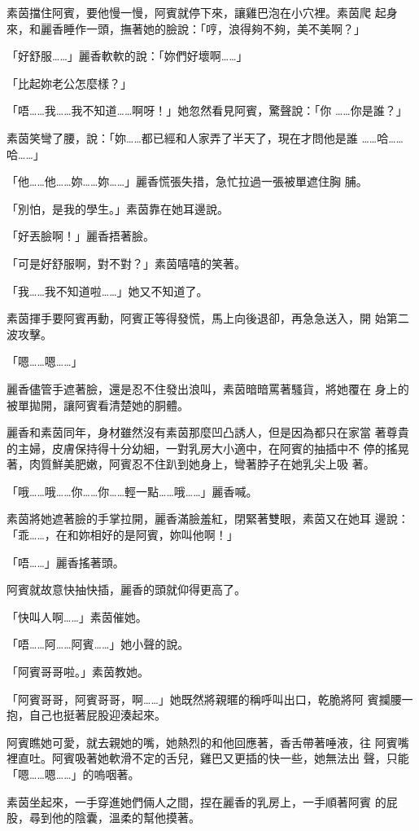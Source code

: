 素茵擋住阿賓，要他慢一慢，阿賓就停下來，讓雞巴泡在小穴裡。素茵爬
起身來，和麗香睡作一頭，撫著她的臉說：「哼，浪得夠不夠，美不美啊？」

「好舒服……」麗香軟軟的說：「妳們好壞啊……」

「比起妳老公怎麼樣？」

「唔……我……我不知道……啊呀！」她忽然看見阿賓，驚聲說：「你
……你是誰？」

素茵笑彎了腰，說：「妳……都已經和人家弄了半天了，現在才問他是誰
……哈……哈……」

「他……他……妳……妳……」麗香慌張失措，急忙拉過一張被單遮住胸
脯。

「別怕，是我的學生。」素茵靠在她耳邊說。

「好丟臉啊！」麗香捂著臉。

「可是好舒服啊，對不對？」素茵嘻嘻的笑著。

「我……我不知道啦……」她又不知道了。

素茵揮手要阿賓再動，阿賓正等得發慌，馬上向後退卻，再急急送入，開
始第二波攻擊。

「嗯……嗯……」

麗香儘管手遮著臉，還是忍不住發出浪叫，素茵暗暗罵著騷貨，將她覆在
身上的被單拋開，讓阿賓看清楚她的胴體。

麗香和素茵同年，身材雖然沒有素茵那麼凹凸誘人，但是因為都只在家當
著尊貴的主婦，皮膚保持得十分幼細，一對乳房大小適中，在阿賓的抽插中不
停的搖晃著，肉質鮮美肥嫩，阿賓忍不住趴到她身上，彎著脖子在她乳尖上吸
著。

「哦……哦……你……你……輕一點……哦……」麗香喊。

素茵將她遮著臉的手掌拉開，麗香滿臉羞紅，閉緊著雙眼，素茵又在她耳
邊說：「乖……，在和妳相好的是阿賓，妳叫他啊！」

「唔……」麗香搖著頭。

阿賓就故意快抽快插，麗香的頭就仰得更高了。

「快叫人啊……」素茵催她。

「唔……阿……阿賓……」她小聲的說。

「阿賓哥哥啦。」素茵教她。

「阿賓哥哥，阿賓哥哥，啊……」她既然將親暱的稱呼叫出口，乾脆將阿
賓攔腰一抱，自己也挺著屁股迎湊起來。

阿賓瞧她可愛，就去親她的嘴，她熱烈的和他回應著，香舌帶著唾液，往
阿賓嘴裡直吐。阿賓吸著她軟滑不定的舌兒，雞巴又更插的快一些，她無法出
聲，只能「嗯……嗯……」的嗚咽著。

素茵坐起來，一手穿進她們倆人之間，捏在麗香的乳房上，一手順著阿賓
的屁股，尋到他的陰囊，溫柔的幫他摸著。

